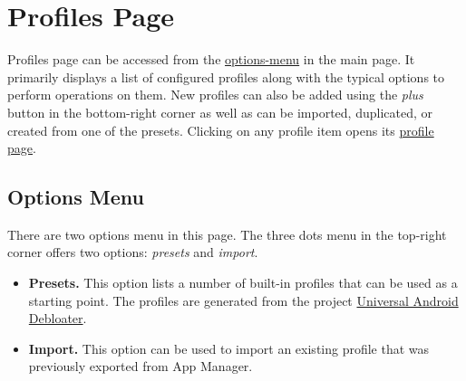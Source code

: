 \section{Profiles Page}\label{sec:profiles-page} %
Profiles page can be accessed from the \hyperref[subsec:main-page-options-menu]{options-menu} in the main page.
It primarily displays a list of configured profiles along with the typical options to perform operations on them.
New profiles can also be added using the \textit{plus} button in the bottom-right corner as well as can be imported,
duplicated, or created from one of the presets. Clicking on any profile item opens its \hyperref[sec:profile-page]{profile page}.

\subsection{Options Menu}\label{subsec:profiles-options-menu} %
There are two options menu in this page. The three dots menu in the top-right corner offers two options:
\textit{presets} and \textit{import}.
\begin{itemize}
    \item \textbf{Presets.} This option lists a number of built-in profiles that can be used as a starting point.
    The profiles are generated from the project \href{https://gitlab.com/W1nst0n/universal-android-debloater}{Universal
    Android Debloater}.\\

    \item \textbf{Import.} This option can be used to import an existing profile that was previously exported from App Manager.
\end{itemize}

